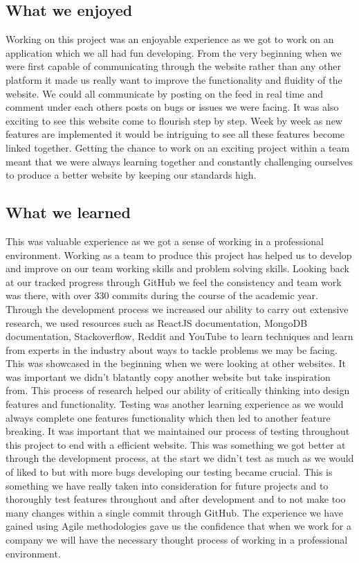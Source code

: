 \subsection{What we enjoyed}
Working on this project was an enjoyable experience as we got to work on an application which we all had fun developing. From the very beginning when we were first capable of communicating through the website rather than any other platform it made us really want to improve the functionality and fluidity of the website. We could all communicate by posting on the feed in real time and comment under each others posts on bugs or issues we were facing. It was also exciting to see this website come to flourish step by step. Week by week as new features are implemented it would be intriguing to see all these features become linked together. Getting the chance to work on an exciting project within a team meant that we were always learning together and constantly challenging ourselves to produce a better website by keeping our standards high.

\subsection{What we learned}
This was valuable experience as we got a sense of working in a professional environment. Working as a team to produce this project has helped us to develop and improve on our team working skills and problem solving skills. Looking back at our tracked progress through GitHub we feel the consistency and team work was there, with over 330 commits during the course of the academic year. Through the development process we increased our ability to carry out extensive research, we used resources such as ReactJS documentation, MongoDB documentation, Stackoverflow, Reddit and YouTube to learn techniques and learn from experts in the industry about ways to tackle problems we may be facing. This was showcased in the beginning when we were looking at other websites. It was important we didn't blatantly copy another website but take inspiration from. This process of research helped our ability of critically thinking into design features and functionality. 
Testing was another learning experience as we would always complete one features functionality which then led to another feature breaking. It was important that we maintained our process of testing throughout this project to end with a efficient website. This was something we got better at through the development process, at the start we didn't test as much as we would of liked to but with more bugs developing our testing became crucial. This is something we have really taken into consideration for future projects and to thoroughly test features throughout and after development and to not make too many changes within a single commit through GitHub.
The experience we have gained using Agile methodologies gave us the confidence that when we work for a company we will have the necessary thought process of working in a professional environment. 

